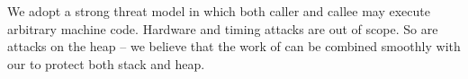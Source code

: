 \documentclass[acmsmall,review,anonymous]{acmart}\settopmatter{printfolios=true,printccs=false,printacmref=false}
\begin{document}
We adopt a strong threat model in which both caller and callee may execute
arbitrary machine code. Hardware and timing attacks are out of scope.
So are attacks on the heap -- we believe that the work of
\citet{DBLP:conf/post/AmorimHP18} can be combined smoothly with our
to protect both stack and heap.





%
\end{document}
